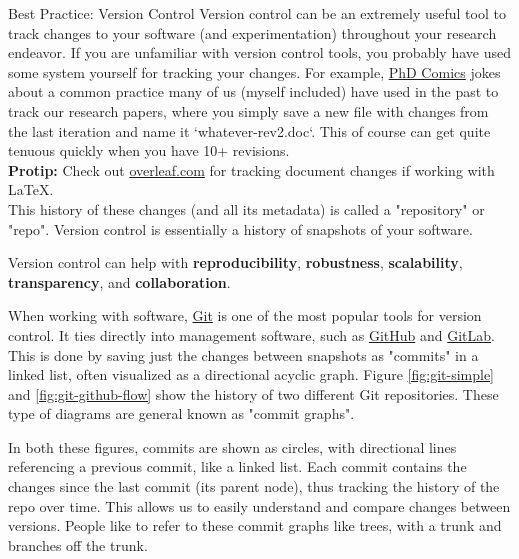 \documentclass[final]{beamer}
\newlength{\colwidth}
\begin{document}
\begin{frame}[t]
\begin{columns}[t]
\begin{column}{\colwidth}
\begin{block}{Best Practice: Version Control}
    Version control can be an extremely useful tool to track changes to your
    software (and experimentation) throughout your research endeavor.
    If you are unfamiliar with version control tools, you probably have used
    some system yourself for tracking your changes.
    For example,
    \href{https://phdcomics.com/comics/archive.php?comicid=1531}{PhD Comics}
    jokes about a common practice many of us (myself included) have used in the
    past to track our research papers, where you simply save a new file with
    changes from the last iteration and name it `whatever-rev2.doc`.
    This of course can get quite tenuous quickly when you have 10+ revisions.
    \\ \vspace{1em}
    \textbf{Protip:} Check out \href{overleaf.com}{overleaf.com} for tracking
    document changes if working with LaTeX.
    \\ \vspace{1em}
    This history of these changes (and all its metadata) is called a
    "repository" or "repo".
    Version control is essentially a history of snapshots of your software.

    Version control can help with \textbf{reproducibility},
    \textbf{robustness}, \textbf{scalability}, \textbf{transparency}, and
    \textbf{collaboration}.

    When working with software, \href{https://git-scm.com/}{Git} is one of the
    most popular tools for version control.
    It ties directly into management software, such as
    \href{https://github.com}{GitHub} and \href{https://gitlab.com}{GitLab}.
    This is done by saving just the changes between snapshots as "commits" in
    a linked list, often visualized as a directional acyclic graph.
    Figure \ref{fig:git-simple} and \ref{fig:git-github-flow} show the history
    of two different Git repositories.
    These type of diagrams are general known as "commit graphs".
    
    In both these figures, commits are shown as circles, with directional lines
    referencing a previous commit, like a linked list.
    Each commit contains the changes since the last commit (its parent node),
    thus tracking the history of the repo over time.
    This allows us to easily understand and compare changes between versions.
    People like to refer to these commit graphs like trees, with a trunk and
    branches off the trunk.


\end{block}
\end{column}
\end{columns}
\end{frame}
\end{document}
